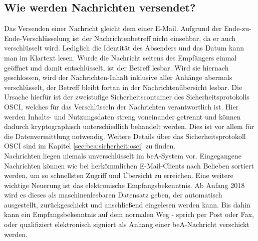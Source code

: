 \subsection{Wie werden Nachrichten versendet?}
Das Versenden einer Nachricht gleicht dem einer E-Mail. Aufgrund der Ende-zu-Ende-Verschlüsselung ist der Nachrichtenbetreff nicht einsehbar, da er auch verschlüsselt wird. Lediglich die Identität des Absenders und das Datum kann man im Klartext lesen. Wurde die Nachricht seitens des Empfängers einmal geöffnet und damit entschlüsselt, ist der Betreff lesbar. Wird sie hiernach geschlossen, wird der Nachrichten-Inhalt inklusive aller Anhänge abermals verschlüsselt, der Betreff bleibt fortan in der Nachrichtenübersicht lesbar. Die Ursache hierfür ist der zweistufige Sicherheitscontainer des Sicherheitsprotokolls OSCI, welches für das Verschlüsseln der Nachrichten verantwortlich ist. Hier werden Inhalts- und Nutzungsdaten streng voneinander getrennt und können dadurch kryptographisch unterschiedlich behandelt werden. Dies ist vor allem für die Datenvermittlung notwendig.\textcite{bea:osci}  Weitere Details über das Sicherheitsprotokoll OSCI sind im Kapitel \ref{sec:bea:sicherheit:osci} zu finden. \\
Nachrichten liegen niemals unverschlüsselt im beA-System vor. Eingegangene Nachrichten können wie bei herkömmlichen E-Mail-Clients nach Belieben sortiert werden, um so schnellsten Zugriff und Übersicht zu erreichen.
Eine weitere wichtige Neuerung ist das elektronische Empfangsbekenntnis. Ab Anfang 2018 wird es dieses als maschinenlesbaren Datensatz geben, der automatisch ausgestellt, zurückgeschickt und anschließend eingelesen werden kann. Bis dahin kann ein Empfangsbekenntnis auf dem normalen Weg - sprich per Post oder Fax, oder qualifiziert elektronisch signiert als Anhang einer beA-Nachricht verschickt werden. 

